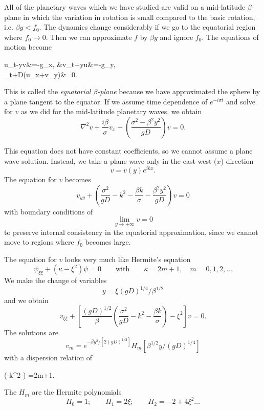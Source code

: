 All of the planetary waves which we have studied are valid on a mid-latitude
$\beta$-plane in which the variation in rotation is small compared to the basic
rotation, i.e. $\beta y<f_0$. The dynamics change considerably if we go to the
equatorial region where $f_0\to0$. Then we can approximate $f$ by $\beta y$ and
ignore $f_0$. The equations of motion become
\begin{wavealign}
	u_t-\beta yv&=-g\eta_x,
	&v_t+\beta yu&=-g\eta_y,\\
	\eta_t+D(u_x+v_y)&=0.
\end{wavealign}
This is called the \emph{equatorial $\beta$-plane} because we have approximated the
sphere by a plane tangent to the equator. If we assume time dependence of
$e^{-i\sigma t}$ and solve for $v$ as we did for the mid-latitude planetary waves, we
obtain
\[
	\nabla^2v+\frac{i\beta}{\sigma}v_x
	+\left(\frac{\sigma^2-\beta^2y^2}{gD}\right)v=0.
\]

\sourcepagebreak

This equation does not have constant coefficients, so we cannot assume a plane wave
solution. Instead, we take a plane wave only in the east-west ($x$) direction
\[
	v=v(y)e^{ikx}.
\]
The equation for $v$ becomes
\[
	v_{yy}+\left(
	\frac{\sigma^2}{gD}-k^2-\frac{\beta k}{\sigma}
	-\frac{\beta^2y^2}{gD}
	\right)v=0
\]
with boundary conditions of
\[
	\lim_{y\to\pm\infty}v=0
\]
to preserve internal consistency in the equatorial approximation, since we cannot move
to regions where $f_0$ becomes large.

The equation for $v$ looks very much like Hermite's equation
\[
	\psi_{\xi\xi}+(\kappa-\xi^2)\psi=0
	\qquad\text{with}\qquad
	\kappa=2m+1,\quad m=0,1,2,\ldots
\]
We make the change of variables
\[
	y=\xi(gD)^{1/4}/\beta^{1/2}
\]
and we obtain
\[
	v_{\xi\xi}+\left[
		\frac{(gD)^{1/2}}{\beta}
		\left(\frac{\sigma^2}{gD}-k^2-\frac{\beta k}{\sigma}\right)
		-\xi^2
		\right]v=0.
\]
The solutions are
\[
	v_m=e^{-\beta y^2/[2(gD)^{1/2}]}
	H_m\!\left[\beta^{1/2}y/(gD)^{1/4}\right]
\]
with a dispersion relation of
\begin{waveequation}
	\left(-k^2-\right)
	=2m+1.
\end{waveequation}
The $H_m$ are the Hermite polynomials
\[
	H_0=1;\qquad H_1=2\xi;\qquad H_2=-2+4\xi^2\ldots
\]

